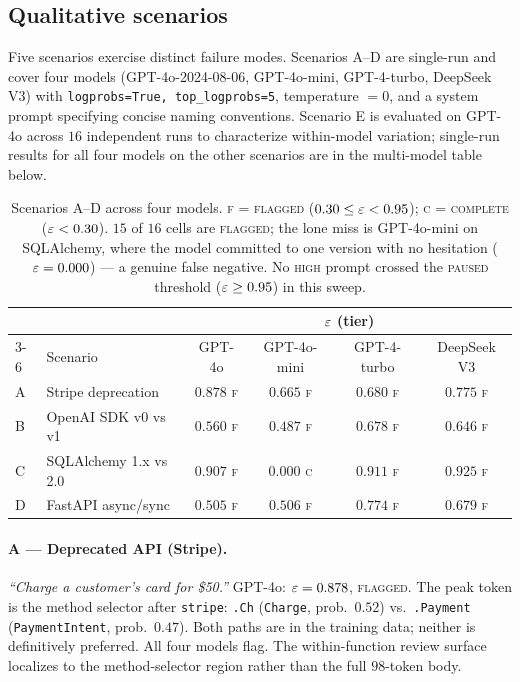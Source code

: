 \subsection{Qualitative scenarios}
\label{subsec:scenarios}

Five scenarios exercise distinct failure modes. Scenarios A--D are
single-run and cover four models (GPT-4o-2024-08-06, GPT-4o-mini,
GPT-4-turbo, DeepSeek V3) with \texttt{logprobs=True,
top\_logprobs=5}, temperature $= 0$, and a system prompt specifying
concise naming conventions. Scenario E is evaluated on GPT-4o across
$16$ independent runs to characterize within-model variation;
single-run results for all four models on the other scenarios are in
the multi-model table below.

\begin{table}[h]
\centering
\small
\begin{tabular}{llcccc}
\toprule
 & & \multicolumn{4}{c}{$\varepsilon$ (tier)} \\
\cmidrule(lr){3-6}
 & Scenario & GPT-4o & GPT-4o-mini & GPT-4-turbo & DeepSeek V3 \\
\midrule
A & Stripe deprecation        & $0.878$ \textsc{f} & $0.665$ \textsc{f} & $0.680$ \textsc{f} & $0.775$ \textsc{f} \\
B & OpenAI SDK v0 vs v1       & $0.560$ \textsc{f} & $0.487$ \textsc{f} & $0.678$ \textsc{f} & $0.646$ \textsc{f} \\
C & SQLAlchemy 1.x vs 2.0     & $0.907$ \textsc{f} & $\mathbf{0.000}$ \textsc{c} & $0.911$ \textsc{f} & $0.925$ \textsc{f} \\
D & FastAPI async/sync        & $0.505$ \textsc{f} & $0.506$ \textsc{f} & $0.774$ \textsc{f} & $0.679$ \textsc{f} \\
\bottomrule
\end{tabular}
\caption{Scenarios A--D across four models. \textsc{f} =
\textsc{flagged} ($0.30 \le \varepsilon < 0.95$); \textsc{c} =
\textsc{complete} ($\varepsilon < 0.30$). $15$ of $16$ cells are
\textsc{flagged}; the lone miss is GPT-4o-mini on SQLAlchemy, where
the model committed to one version with no hesitation ($\varepsilon =
0.000$) --- a genuine false negative. No \textsc{high} prompt
crossed the \textsc{paused} threshold ($\varepsilon \ge 0.95$) in this
sweep.}
\label{tab:scenarios-multimodel}
\end{table}

\paragraph{A --- Deprecated API (Stripe).}
\textit{``Charge a customer's card for \$50.''} GPT-4o: $\varepsilon =
0.878$, \textsc{flagged}. The peak token is the method selector
after \texttt{stripe}: \texttt{.Ch} (\texttt{Charge}, prob.\ $0.52$)
vs.\ \texttt{.Payment} (\texttt{PaymentIntent}, prob.\ $0.47$). Both
paths are in the training data; neither is definitively preferred.
All four models flag. The within-function review surface localizes
to the method-selector region rather than the full $98$-token body.

